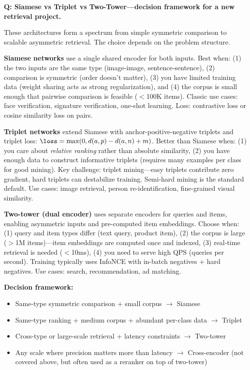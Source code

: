 \begin{interviewq}
\textbf{Q: Siamese vs Triplet vs Two-Tower---decision framework for a new retrieval project.}

 \quad {} \quad \badgefreq{\freqhigh}

\stronganswer

These architectures form a spectrum from simple symmetric comparison to scalable asymmetric retrieval. The choice depends on the problem structure.

\textbf{Siamese networks} use a single shared encoder for both inputs. Best when: (1) the two inputs are the same type (image-image, sentence-sentence), (2) comparison is symmetric (order doesn't matter), (3) you have limited training data (weight sharing acts as strong regularization), and (4) the corpus is small enough that pairwise comparison is feasible ($<$100K items). Classic use cases: face verification, signature verification, one-shot learning. Loss: contrastive loss or cosine similarity loss on pairs.

\textbf{Triplet networks} extend Siamese with anchor-positive-negative triplets and triplet loss: $\loss = \max(0, d(a,p) - d(a,n) + m)$. Better than Siamese when: (1) you care about \textit{relative ranking} rather than absolute similarity, (2) you have enough data to construct informative triplets (requires many examples per class for good mining). Key challenge: triplet mining---easy triplets contribute zero gradient, hard triplets can destabilize training. Semi-hard mining is the standard default. Use cases: image retrieval, person re-identification, fine-grained visual similarity.

\textbf{Two-tower (dual encoder)} uses separate encoders for queries and items, enabling asymmetric inputs and pre-computed item embeddings. Choose when: (1) query and item types differ (text query, product item), (2) the corpus is large ($>$1M items)---item embeddings are computed once and indexed, (3) real-time retrieval is needed ($<$10ms), (4) you need to serve high QPS (queries per second). Training typically uses InfoNCE with in-batch negatives + hard negatives. Use cases: search, recommendation, ad matching.

\textbf{Decision framework:}
\begin{itemize}
    \item Same-type symmetric comparison + small corpus $\to$ Siamese
    \item Same-type ranking + medium corpus + abundant per-class data $\to$ Triplet
    \item Cross-type or large-scale retrieval + latency constraints $\to$ Two-tower
    \item Any scale where precision matters more than latency $\to$ Cross-encoder (not covered above, but often used as a reranker on top of two-tower)
\end{itemize}


\end{interviewq}
